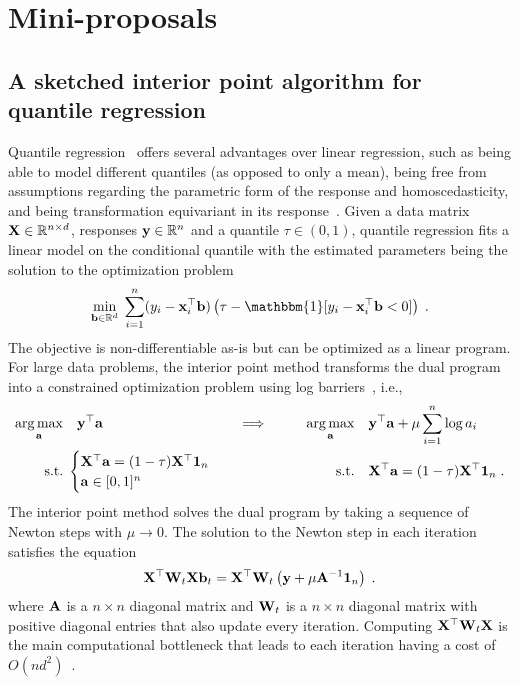 

\section{Mini-proposals}

\subsection*{A sketched interior point algorithm for quantile regression} %

Quantile regression~\citep{Koenker:1978} offers several advantages over linear regression, such as being able to model different quantiles (as opposed to only a mean), being free from assumptions regarding the parametric form of the response and homoscedasticity, and being transformation equivariant in its response~\citep{Rodriguez:2017}. Given a data matrix $\mathbf{X}\in\mathbb{R}^{n\times d}$, responses $\mathbf{y}\in\mathbb{R}^{n}$ and a quantile $\tau\in(0,1)$, quantile regression fits a linear model on the conditional quantile with the estimated parameters being the solution to the optimization problem
\[
\min_{\bfb\in\bbR^d} \; \sum_{i=1}^n(y_i-\bfx_i^\T\bfb)\left(\tau - \mathbbm{1}[y_i-\bfx_i^\top\bfb < 0]\right) \;.
\]
The objective is non-differentiable as-is but can be optimized as a linear program. For large data problems, the interior point method transforms the dual program into a constrained optimization problem using log barriers~\citep{Portnoy:1997}, i.e.,
\begin{align*}
\operatorname*{arg\,max}_{\mathbf{a}}&\quad \mathbf{y}^\top\mathbf{a} & &\Longrightarrow\qquad & 
\operatorname*{arg\,max}_{\mathbf{a}}&\quad \mathbf{y}^\top\mathbf{a}+\mu\sum_{i=1}^n\log a_i \\
\text{s.t.}&\;\begin{cases}
\mathbf{X}^\top\mathbf{a}=(1-\tau)\mathbf{X}^\top\mathbf{1}_n \\ \mathbf{a}\in[0,1]^n 
\end{cases} &&& \text{s.t.}&\quad \mathbf{X}^\top\mathbf{a}=(1-\tau)\mathbf{X}^\top\mathbf{1}_n \;.
\end{align*}
The interior point method solves the dual program by taking a sequence of Newton steps with $\mu\rightarrow0$. The solution to the Newton step in each iteration satisfies the equation
\[
\mathbf{X}^\top\mathbf{W}_t\mathbf{X}\mathbf{b}_t = \mathbf{X}^\top\mathbf{W}_t\left(\mathbf{y}+\mu\mathbf{A}^{-1}\mathbf{1}_n\right) \;.
\]
where $\mathbf{A}$ is a $n\times n$ diagonal matrix and $\mathbf{W}_t$ is a $n\times n$ diagonal matrix with positive diagonal entries that also update every iteration. Computing $\mathbf{X}^\top\mathbf{W}_t\mathbf{X}$ is the main computational bottleneck that leads to each iteration having a cost of $O(nd^2)$~\citep{Chen:2005}.
\\

